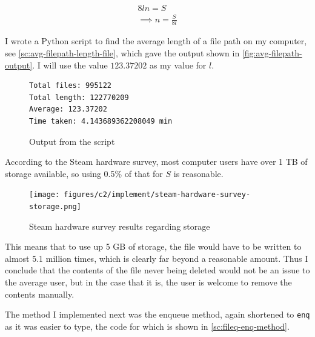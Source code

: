 \documentclass[11pt]{article}
\begin{document}
            \begin{align*}
                8ln = S \\
                \implies n = \frac{S}{8l}
            \end{align*}

            I wrote a Python script to find the average length of a file path on my computer, see \autoref{sc:avg-filepath-length-file}, which gave the output shown in \autoref{fig:avg-filepath-output}. I will use the value $123.37202$ as my value for $l$. 

            \begin{figure}[!h]
                \begin{verbatim}
Total files: 995122
Total length: 122770209
Average: 123.37202
Time taken: 4.143689362208049 min
                \end{verbatim}
                \caption{Output from the script}
                \label{fig:avg-filepath-output}
            \end{figure}

            According to the Steam hardware survey, most computer users have over 1 \si{TB} of storage available, so using 0.5\% of that for $S$ is reasonable. 

            \begin{figure}[!h]
                \centering
                \texttt{[image: figures/c2/implement/steam-hardware-survey-storage.png]}
                \caption{Steam hardware survey results regarding storage}
                \label{fig:steam-hw-survey-storage}
            \end{figure}

            This means that to use up 5 \si{GB} of storage, the file would have to be written to almost 5.1 million times, which is clearly far beyond a reasonable amount. Thus I conclude that the contents of the file never being deleted would not be an issue to the average user, but in the case that it is, the user is welcome to remove the contents manually. 

            
            \vspace{10pt}
            The method I implemented next was the enqueue method, again shortened to \verb|enq| as it was easier to type, the code for which is shown in \autoref{sc:fileq-enq-method}. 
\end{document}
